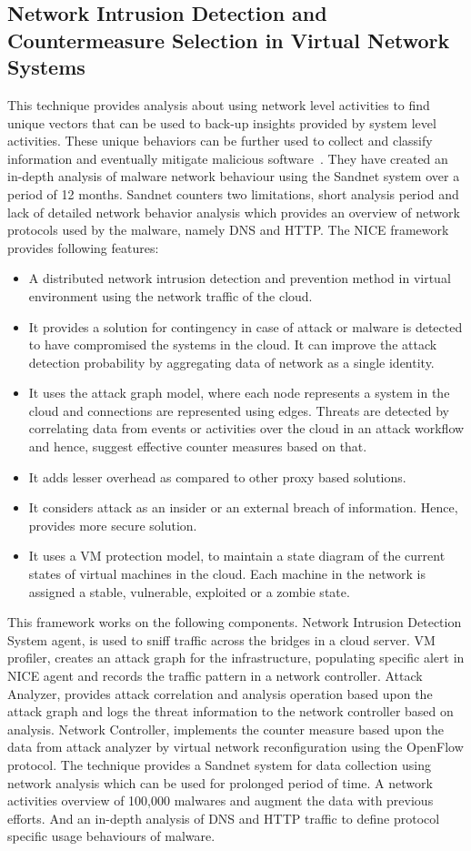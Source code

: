 \documentclass[11pt]{article}
\begin{document}
	\subsection{Network Intrusion Detection and Countermeasure Selection in Virtual Network Systems}
	This technique provides analysis about using network level activities to find unique vectors that can be used to back-up insights provided by system level activities. These unique behaviors can be further used to collect and classify information and eventually mitigate malicious software~\cite{chung2013nice}.
	They have created an in-depth analysis of malware network behaviour using the Sandnet system over a period of 12 months. Sandnet counters two limitations, short analysis period and lack of detailed network behavior analysis which provides an overview of network protocols used by the malware, namely DNS and HTTP. 
	The NICE framework provides following features:
	\begin{itemize}
		\item A distributed network intrusion detection and prevention method in virtual environment using the network traffic of the cloud.
		\item It provides a solution for contingency in case of attack or malware is detected to have compromised the systems in the cloud. It can improve the attack detection probability by aggregating data of network as a single identity.
		\item It uses the attack graph model, where each node represents a system in the cloud and connections are represented using edges. Threats are detected by correlating data from events or activities over the cloud in an attack workflow and hence, suggest effective counter measures based on that.
		\item It adds lesser overhead as compared to other proxy based solutions.
		\item It considers attack as an insider or an external breach of information. Hence, provides more secure solution.
		\item It uses a VM protection model, to maintain a state diagram of the current states of virtual machines in the cloud. Each machine in the network is assigned a stable, vulnerable, exploited or a zombie state.
	\end{itemize}
	This framework works on the following components. Network Intrusion Detection System agent, is used to sniff traffic across the bridges in a cloud server. VM profiler, creates an attack graph for the infrastructure, populating specific alert in NICE agent and records the traffic pattern in a network controller. Attack Analyzer, provides attack correlation and analysis operation based upon the attack graph and logs the threat information to the network controller based on analysis. Network Controller, implements the counter measure based upon the data from attack analyzer by virtual network reconfiguration using the OpenFlow protocol.
	The technique provides a Sandnet system for data collection using network analysis which can be used for prolonged period of time. A network activities overview of 100,000 malwares and augment the data with previous efforts. And an in-depth analysis of DNS and HTTP traffic to define protocol specific usage behaviours of malware. 
	
\end{document}
